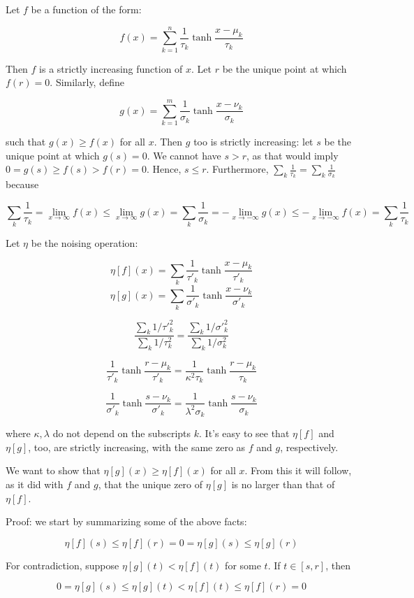 Let $f$ be a function of the form:

\[f(x) = \sum_{k=1}^n \frac{1}{\tau_k} \tanh \frac {x-\mu_k} {\tau_k}\]

Then $f$ is a strictly increasing function of $x$. Let $r$ be the unique point at which $f(r) = 0$. Similarly, define

\[g(x) = \sum_{k=1}^m \frac{1}{\sigma_k} \tanh \frac {x-\nu_k} {\sigma_k}\]

such that $g(x) \ge f(x)$ for all $x$. Then $g$ too is strictly increasing: let $s$ be the unique point at which $g(s) = 0$. We cannot have $s > r$, as that would imply $0 = g(s) \ge f(s) > f(r) = 0$. Hence, $s \le r$. Furthermore, $\sum_k \frac{1}{\tau_k} = \sum_k \frac{1}{\sigma_k}$ because

\[\sum_k \frac{1}{\tau_k}
= \lim_{x\rightarrow\infty} f(x)
\le \lim_{x\rightarrow\infty} g(x)
= \sum_k \frac{1}{\sigma_k}
= -\lim_{x\rightarrow -\infty} g(x)
\le -\lim_{x\rightarrow -\infty} f(x)
= \sum_k \frac{1}{\tau_k}\]

Let $\eta$ be the noising operation:

\[\eta[f](x) = \sum_k \frac{1}{\tau'_k} \tanh \frac {x-\mu_k} {\tau'_k}\]
\[\eta[g](x) = \sum_k \frac{1}{\sigma'_k} \tanh \frac {x-\nu_k} {\sigma'_k}\]

\[ \frac{\sum_k 1 / \tau'^2_k}{\sum_k 1 / \tau^2_k} = \frac{\sum_k 1 / \sigma'^2_k}{\sum_k 1 / \sigma^2_k} \]

\[\frac{1}{\tau'_k} \tanh \frac {r-\mu_k} {\tau'_k}
= \frac{1}{\kappa^2\tau_k} \tanh \frac {r-\mu_k} {\tau_k}\]

\[\frac{1}{\sigma'_k} \tanh \frac {s-\nu_k} {\sigma'_k}
= \frac{1}{\lambda^2\sigma_k} \tanh \frac {s-\nu_k} {\sigma_k}\]

where $\kappa,\lambda$ do not depend on the subscripts $k$. It's easy to see that $\eta[f]$ and $\eta[g]$, too, are strictly increasing, with the same zero as $f$ and $g$, respectively.

We want to show that $\eta[g](x) \ge \eta[f](x)$ for all $x$. From this it will follow, as it did with $f$ and $g$, that the unique zero of $\eta[g]$ is no larger than that of $\eta[f]$.

Proof: we start by summarizing some of the above facts:

\[ \eta[f](s) \le \eta[f](r) = 0 = \eta[g](s) \le \eta[g](r) \]

For contradiction, suppose $\eta[g](t) < \eta[f](t)$ for some $t$. If $t\in [s,r]$, then

\[ 0 = \eta[g](s) \le \eta[g](t) < \eta[f](t) \le \eta[f](r) = 0 \]

